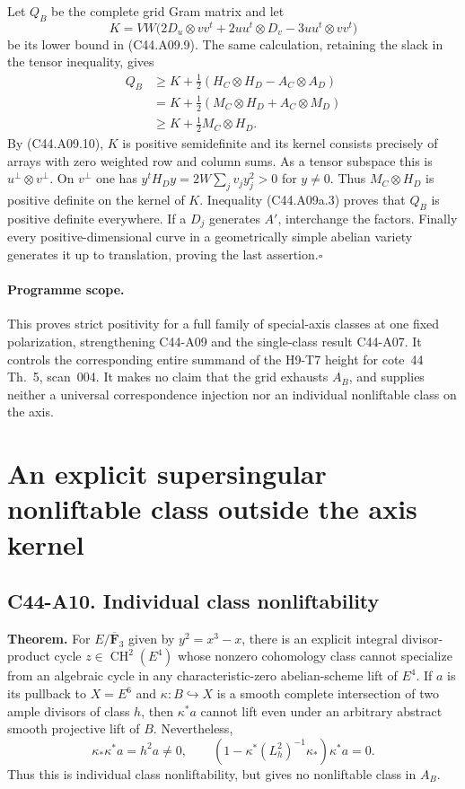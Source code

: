 \documentclass[11pt]{article}
\theoremstyle{remark}\newtheorem{remark}[theorem]{Remark}
\begin{document}
Let $Q_B$ be the complete grid Gram matrix and let
\[
 K=VW\bigl(2D_u\otimes vv^t+2uu^t\otimes D_v
                         -3uu^t\otimes vv^t\bigr)
\]
be its lower bound in (C44.A09.9). The same calculation, retaining
the slack in the tensor inequality, gives
\[
 \begin{split}
 Q_B&\ge K+\tfrac12(H_C\otimes H_D-A_C\otimes A_D)\\
    &=K+\tfrac12(M_C\otimes H_D+A_C\otimes M_D)\\
    &\ge K+\tfrac12M_C\otimes H_D.
 \end{split}
 \tag{C44.A09a.3}
\]
By (C44.A09.10), $K$ is positive semidefinite and its kernel
consists precisely of arrays with zero weighted row and
column sums. As a tensor subspace this is
$u^\perp\otimes v^\perp$.
On $v^\perp$ one has
$y^tH_Dy=2W\sum_jv_jy_j^2>0$ for $y\ne0$.
Thus $M_C\otimes H_D$ is positive definite on the kernel
of $K$. Inequality (C44.A09a.3) proves that $Q_B$ is positive
definite everywhere. If a $D_j$ generates $A'$, interchange
the factors. Finally every positive-dimensional curve in a
geometrically simple abelian variety generates it up to
translation, proving the last assertion.\hfill$\square$

\paragraph{Programme scope.}
This proves strict positivity for a full family of special-axis
classes at one fixed polarization, strengthening C44-A09 and
the single-class result C44-A07. It controls the corresponding
entire summand of the H9-T7 height for cote~44 Th.~5, scan~004.
It makes no claim that the grid exhausts $A_B$, and supplies
neither a universal correspondence injection nor an individual
nonliftable class on the axis.


\section{An explicit supersingular nonliftable class outside the axis kernel}
\subsection*{C44-A10. Individual class nonliftability}

\textbf{Theorem.}
For $E/\overline{\mathbf F}_3$ given by $y^2=x^3-x$, there is an
explicit integral divisor-product cycle $z\in\operatorname{CH}^2(E^4)$
whose nonzero cohomology class cannot specialize from an algebraic
cycle in any characteristic-zero abelian-scheme lift of $E^4$.
If $a$ is its pullback to $X=E^6$ and $\kappa:B\hookrightarrow X$
is a smooth complete intersection of two ample divisors of class $h$,
then $\kappa^*a$ cannot lift even under an arbitrary abstract smooth
projective lift of $B$. Nevertheless,
\[
 \kappa_*\kappa^*a=h^2a\ne0,\qquad
 (1-\kappa^*(L_h^2)^{-1}\kappa_*)\kappa^*a=0.                 \tag{A10.1}
\]
Thus this is individual class nonliftability, but gives no
nonliftable class in $A_B$.
\end{document}
